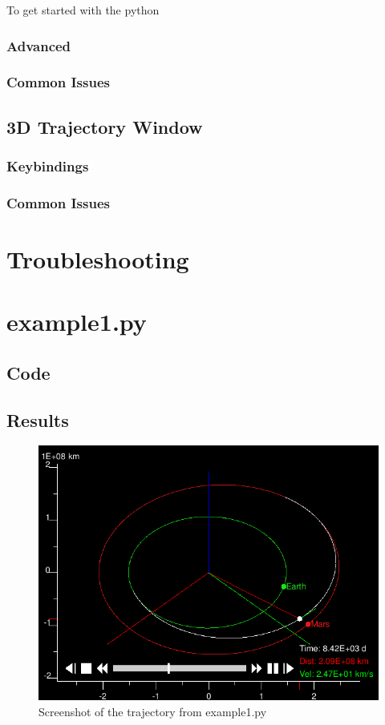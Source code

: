 \documentclass[a4paper,11pt]{article}
\begin{document}
To get started with the python


\subsubsection{Advanced}


\subsubsection{Common Issues}


\subsection{3D Trajectory Window}


\subsubsection{Keybindings}


\subsubsection{Common Issues}


\section{Troubleshooting}


\appendix

\section{example1.py}

\subsection{Code}

\subsection{Results}
\begin{figure}[h!]
\centering
\includegraphics[width=1\textwidth]{img/example1}
\caption{Screenshot of the trajectory from example1.py}
\label{img:example1}
\end{figure}
\end{document}
